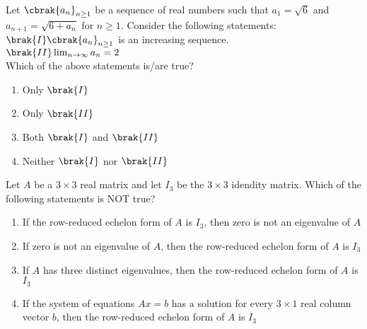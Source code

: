 \item{
Let $\cbrak{a_n}_{n\geq 1}$ be a sequence of real numbers such that $a_1=\sqrt{6}$ and $a_{n+1}=\sqrt{6+a_n}$ for $n\geq 1$. Consider the following statements:\\
$\brak{I}\cbrak{a_n}_{n\geq 1}$ is an increasing sequence.\\
$\brak{II}\lim_{n\to\infty}a_n=2$\\
Which of the above statements is/are true?
\begin{multicols}{2}
    \begin{enumerate}
        \item Only $\brak{I}$
        \item Only $\brak{II}$
        \item Both $\brak{I}$ and $\brak{II}$
        \item Neither $\brak{I}$ nor $\brak{II}$
    \end{enumerate}
\end{multicols}
}
\item{
Let $A$ be a $3\times 3$ real matrix and let $I_3$ be the $3\times 3$ idendity matrix. Which of the following statements is NOT true?
\begin{enumerate}
    \item If the row-reduced echelon form of $A$ is $I_3$, then zero is not an eigenvalue of $A$
    \item If zero is not an eigenvalue of $A$, then the row-reduced echelon form of $A$ is $I_3$
    \item If $A$ has three distinct eigenvalues, then the row-reduced echelon form of $A$ is $I_3$
    \item If the system of equations $Ax=b$ has a solution for every $3\times 1$ real column vector $b$, then the row-reduced echelon form of $A$ is $I_3$
\end{enumerate}

}
